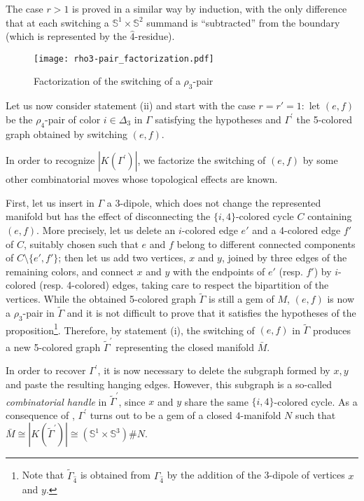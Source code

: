 \documentclass[12pt,a4paper]{article}
\newcommand{\G}{\Gamma}
\begin{document}
The case $r  > 1$ is proved in a similar way by induction, with the only difference that at each switching a $\mathbb S^1\times\mathbb S^2$ summand is ``subtracted'' from the boundary (which is represented by the $\hat 4$-residue).
\medskip

\begin{figure} [h!]
   \centering
   \texttt{[image: rho3-pair\_factorization.pdf]}
\caption{Factorization of the switching of a $\rho_3$-pair}
    \label{fig:ro3pair}
\end{figure}

Let us now consider statement (ii) and start with the case $r=r'=1:$  let $(e,f)$ be the $\rho_4$-pair of color $i\in\Delta_3$ in $\G$ satisfying the hypotheses and $\G^\prime$ the 5-colored graph obtained by switching $(e,f).$

In order to recognize $|K(\G^\prime)|$, we factorize the switching of $(e,f)$ by some other combinatorial moves whose topological effects are known. 

First, let us insert in $\G$ a 3-dipole, which does not change the represented manifold but has the effect of disconnecting the $\{i,4\}$-colored cycle $C$ containing $(e,f)$. More precisely, let us delete an $i$-colored edge  $e'$ and a 4-colored  edge $f'$ of $C$, suitably chosen such that $e$ and $f$ belong to different connected components of $C\setminus\{e',f'\}$; then let us add two vertices, $x$ and $y$, joined by three edges of the remaining colors, and connect $x$ and $y$ with the endpoints of $e'$ (resp. $f'$) by $i$-colored (resp. 4-colored) edges, taking care to respect the bipartition of the vertices. While the obtained 5-colored graph $\tilde\G$ is still a gem of $M$, $(e,f)$ is now a $\rho_3$-pair in $\tilde\G$ and it is not difficult to prove that it satisfies the hypotheses of the proposition\footnote{Note that $\tilde\G_{\hat 4}$ is obtained from $\G_{\hat 4}$ by the addition of the 3-dipole  of vertices $x$ and $y$.}. 
Therefore, by statement (i), the switching of $(e,f)$ in $\tilde\G$ produces a new 5-colored graph $\tilde\G^\prime$ representing the closed manifold $\bar M.$  

In order to recover $\G^\prime$, it is now necessary to delete the subgraph formed by $x,y$ and paste the resulting hanging edges. However, this subgraph is a so-called {\it combinatorial handle} in $\tilde\G^\prime$, since $x$ and $y$ share the same $\{i,4\}$-colored cycle. As a consequence of  \cite[Theorem 7]{Gagliardi-Volzone}, $\G^\prime$ turns out to be a gem of a closed $4$-manifold $N$ such that $\bar M\cong |K(\tilde\G^\prime)|\cong (\mathbb S^1\times\mathbb S^3)\# N.$
\end{document}
